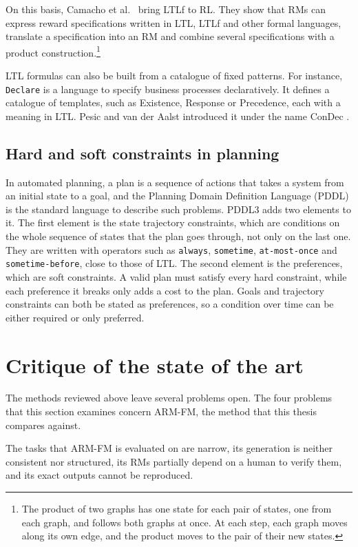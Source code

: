 \documentclass[11pt,english,listoffigures,listoftables]{tfgetsinf}
\begin{document}
On this basis, Camacho et al.~\cite{camacho2019ltl} bring LTLf to RL. They show that RMs can express reward specifications written in LTL, LTLf and other formal languages, translate a specification into an RM and combine several specifications with a product construction.\footnote{The product of two graphs has one state for each pair of states, one from each graph, and follows both graphs at once. At each step, each graph moves along its own edge, and the product moves to the pair of their new states.}

LTL formulas can also be built from a catalogue of fixed patterns. For instance, \texttt{Declare} is a language to specify business processes declaratively. It defines a catalogue of templates, such as Existence, Response or Precedence, each with a meaning in LTL. Pesic and van der Aalst introduced it under the name ConDec \cite{pesic2006declarative}.

\subsection{Hard and soft constraints in planning}
\label{sec:sota-preferences}
In automated planning, a plan is a sequence of actions that takes a system from an initial state to a goal, and the Planning Domain Definition Language (PDDL) is the standard language to describe such problems. PDDL3 \cite{gerevini2006preferences} adds two elements to it. The first element is the state trajectory constraints, which are conditions on the whole sequence of states that the plan goes through, not only on the last one. They are written with operators such as \texttt{always}, \texttt{sometime}, \texttt{at-most-once} and \texttt{sometime-before}, close to those of LTL. The second element is the preferences, which are soft constraints. A valid plan must satisfy every hard constraint, while each preference it breaks only adds a cost to the plan. Goals and trajectory constraints can both be stated as preferences, so a condition over time can be either required or only preferred.

\section{Critique of the state of the art}
\label{sec:critique}
The methods reviewed above leave several problems open. The four problems that this section examines concern ARM-FM, the method that this thesis compares against. 

The tasks that ARM-FM is evaluated on are narrow, its generation is neither consistent nor structured, its RMs partially depend on a human to verify them, and its exact outputs cannot be reproduced.
\end{document}
